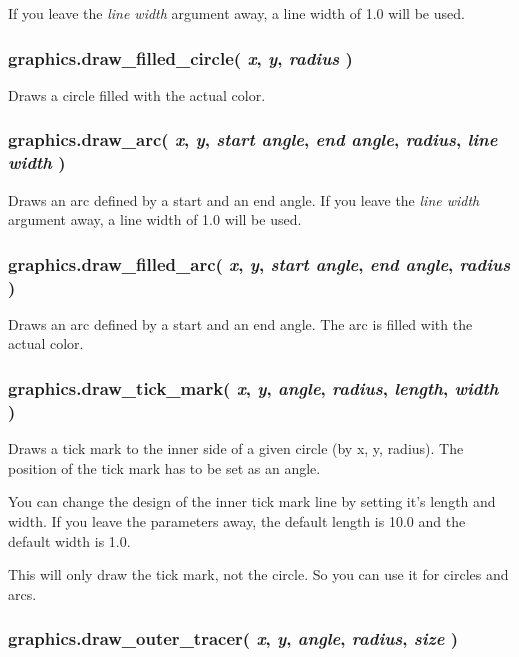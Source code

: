 \documentclass[11pt,parskip=half,a4paper]{scrartcl}
\begin{document}
If you leave the \emph{line width} argument away, a line width of 1.0 will be used.

\subsubsection{graphics.draw\_filled\_circle( \emph{x}, \emph{y}, \emph{radius} )}

Draws a circle filled with the actual color.

\subsubsection{graphics.draw\_arc( \emph{x}, \emph{y}, \emph{start angle}, \emph{end angle}, \emph{radius}, \emph{line width} )}

Draws an arc defined by a start and an end angle. If you leave the \emph{line width} argument away, a line width of 1.0 will be used.

\subsubsection{graphics.draw\_filled\_arc( \emph{x}, \emph{y}, \emph{start angle}, \emph{end angle}, \emph{radius} )}

Draws an arc defined by a start and an end angle. The arc is filled with the actual color.

\subsubsection{graphics.draw\_tick\_mark( \emph{x}, \emph{y}, \emph{angle}, \emph{radius}, \emph{length}, \emph{width} )}

Draws a tick mark to the inner side of a given circle (by x, y, radius). The position of the tick mark has to be set as an angle.

You can change the design of the inner tick mark line by setting it's length and width. If you leave the parameters away, the default length is 10.0 and the default width is 1.0.

This will only draw the tick mark, not the circle. So you can use it for circles and arcs.

\subsubsection{graphics.draw\_outer\_tracer( \emph{x}, \emph{y}, \emph{angle}, \emph{radius}, \emph{size} )}
\end{document}

